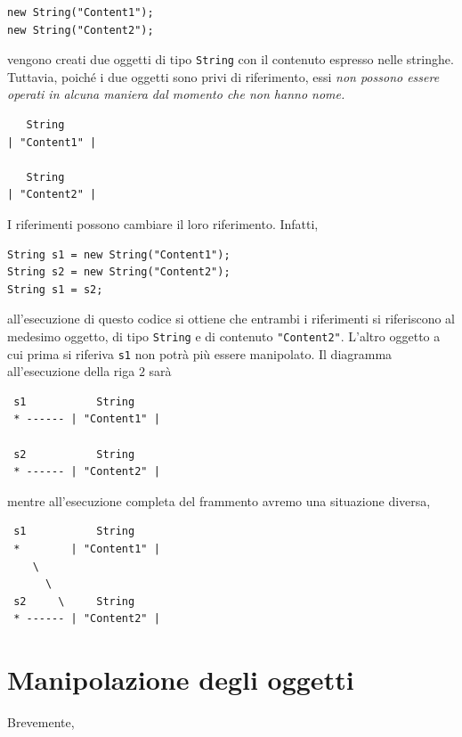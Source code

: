 \documentclass[\fontsizeclass,twocolumn]{\classname}
\theoremstyle{definition}
\theoremstyle{definition}
\begin{document}
\begin{lstlisting}
new String("Content1");
new String("Content2");
\end{lstlisting}

vengono creati due oggetti di tipo \texttt{String} con il contenuto espresso
nelle stringhe. Tuttavia, poiché i due oggetti sono privi di riferimento, essi
\emph{non possono essere operati in alcuna maniera dal momento che non hanno nome.}

\begin{verbatim}
   String
| "Content1" |

   String
| "Content2" |
\end{verbatim}


I riferimenti possono cambiare il loro riferimento. Infatti,

\begin{lstlisting}
String s1 = new String("Content1");
String s2 = new String("Content2");
String s1 = s2;
\end{lstlisting}

all'esecuzione di questo codice si ottiene che entrambi i riferimenti si
riferiscono al medesimo oggetto, di tipo \texttt{String} e di contenuto
\texttt{"Content2"}. L'altro oggetto a cui prima si riferiva \texttt{s1} non
potrà più essere manipolato. Il diagramma all'esecuzione della riga $2$ sarà

\begin{verbatim}
 s1           String
 * ------ | "Content1" |

 s2           String
 * ------ | "Content2" |
\end{verbatim}

mentre all'esecuzione completa del frammento avremo una situazione diversa,

\begin{verbatim}
 s1           String
 *        | "Content1" |
    \
      \
 s2     \     String
 * ------ | "Content2" |
\end{verbatim}

\section{Manipolazione degli oggetti}

Brevemente,
\end{document}

